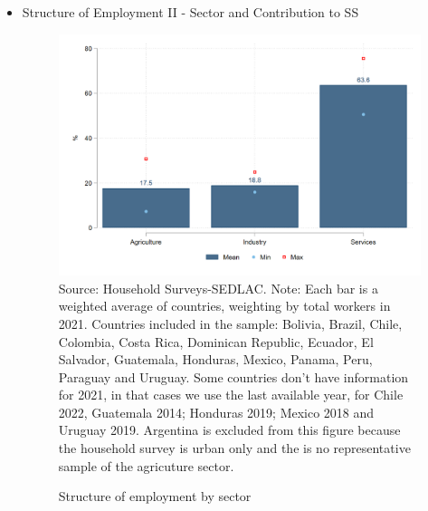\documentclass[english]{article}
\begin{document}
\begin{itemize}
\begin{figure}[htb!]
\end{figure}
         

        
\item Structure of Employment II - Sector and Contribution to SS

\begin{figure}[!htb]
        \justifying
        \caption{Structure of employment by sector}     
        \includegraphics[scale=.3]{latex/figures/Snapshot/Structure of employment and sector.png}
        \label{fig:sector}
       \footnotesize{Source: Household Surveys-SEDLAC.}
        \footnotesize{Note: Each bar is a weighted average of countries, weighting by total workers in 2021. Countries included in the sample: Bolivia, Brazil, Chile, Colombia, Costa Rica, Dominican Republic, Ecuador, El Salvador, Guatemala, Honduras, Mexico, Panama, Peru, Paraguay and Uruguay. Some countries don’t have information for 2021, in that cases we use the last available year, for Chile 2022, Guatemala 2014; Honduras 2019; Mexico 2018 and Uruguay 2019. Argentina is excluded from this figure because the household survey is urban only and the is no representative sample of the agricuture sector.}
\end{figure}


\end{itemize}
\end{document}
